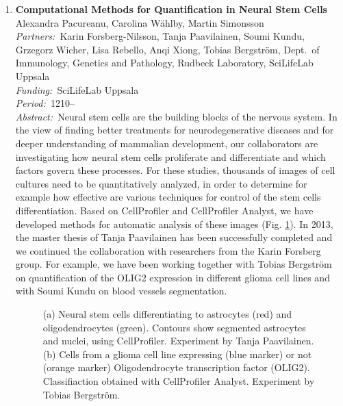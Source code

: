 \documentclass[10pt, a4paper]{article}
\newcommand{\aabstract}[1]{\emph{Abstract:~}#1}
\newcommand{\ffunding}[1]{\emph{Funding:~}#1\\}
\newcommand{\ppartners}[1]{\emph{Partners:~}#1\\}
\newcommand{\pperiod}[1]{\emph{Period:~}#1\\}
\begin{document}
\begin{enumerate}
\item 
\textbf{Computational Methods for Quantification in Neural Stem Cells}\\
Alexandra Pacureanu, Carolina W\"{a}hlby, Martin Simonsson\\
\ppartners{Karin Forsberg-Nilsson, Tanja Paavilainen, Soumi Kundu, Grzegorz Wicher, Lisa Rebello, Anqi Xiong, Tobias Bergstr\"{o}m, Dept.~of Immunology, Genetics and Pathology, Rudbeck Laboratory, SciLifeLab Uppsala}
\ffunding{SciLifeLab Uppsala}
\pperiod{1210--}
\aabstract{Neural stem cells are the building blocks of the nervous system. In the view of finding better treatments for neurodegenerative diseases and for deeper understanding of mammalian development, our collaborators are investigating how neural stem cells proliferate and differentiate and which factors govern these processes. For these studies, thousands of images of cell cultures need to be quantitatively analyzed, in order to determine for example how effective are various techniques for control of the stem cells differentiation. Based on CellProfiler and CellProfiler Analyst, we have developed methods for automatic analysis of these images (Fig. \ref{fig::stem_cells}). In 2013, the master thesis of Tanja Paavilainen has been successfully completed and we continued the collaboration with researchers from the Karin Forsberg group. For example, we have been working together with Tobias Bergstr\"{o}m on quantification of the OLIG2 expression in different glioma cell lines and with Soumi Kundu on blood vessels segmentation.}
\clearpage
\begin{figure}[!htbp]
\centering
{}
\caption{(a) Neural stem cells differentiating to astrocytes (red) and oligodendrocytes (green). Contours show segmented astrocytes and nuclei, using CellProfiler. Experiment by Tanja Paavilainen. (b) Cells from a glioma cell line expressing (blue marker) or not (orange marker) Oligodendrocyte transcription factor (OLIG2). Classifiaction obtained with CellProfiler Analyst. Experiment by Tobias Bergstr\"{o}m.}
\label{fig::stem_cells}
\end{figure}


\end{enumerate}
\end{document}
